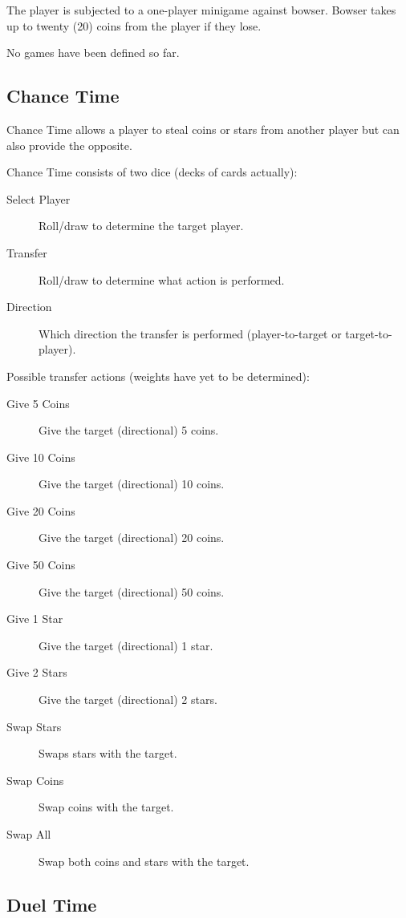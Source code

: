 \documentclass{article}
\begin{document}
The player is subjected to a one-player minigame against bowser.  Bowser takes up to
twenty (20) coins from the player if they lose.


\noindent
No games have been defined so far.

\subsection{Chance Time}

Chance Time allows a player to steal coins or stars from another player but can also
provide the opposite.


\noindent
Chance Time consists of two dice (decks of cards actually):

\begin{description}
\item[Select Player] Roll/draw to determine the target player.
\item[Transfer] Roll/draw to determine what action is performed.
\item[Direction] Which direction the transfer is performed
(player-to-target or target-to-player).
\end{description}


\noindent
Possible transfer actions (weights have yet to be determined):

\begin{description}
\item[Give 5 Coins] Give the target (directional) 5 coins.
\item[Give 10 Coins] Give the target (directional) 10 coins.
\item[Give 20 Coins] Give the target (directional) 20 coins.
\item[Give 50 Coins] Give the target (directional) 50 coins.
\item[Give 1 Star] Give the target (directional) 1 star.
\item[Give 2 Stars] Give the target (directional) 2 stars.
\item[Swap Stars] Swaps stars with the target.
\item[Swap Coins] Swap coins with the target.
\item[Swap All] Swap both coins and stars with the target.
\end{description}

\subsection{Duel Time}
\end{document}

